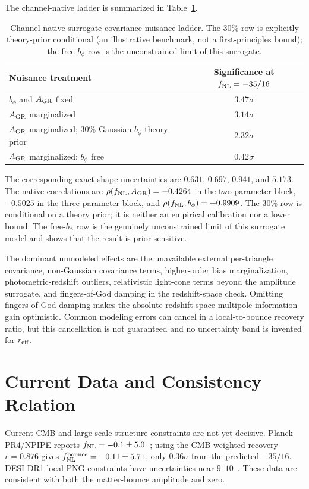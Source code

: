 \documentclass[aps,prd,twocolumn,superscriptaddress,showpacs,preprintnumbers,nofootinbib,longbibliography,floatfix]{revtex4-2}
\newcommand{\fnl}{f_{\rm NL}}
\begin{document}
The channel-native ladder is summarized in Table~\ref{tab:nuisance-ladder}.
\begin{table}[t]
\centering
\caption{Channel-native surrogate-covariance nuisance ladder. The 30\% row is explicitly theory-prior conditional (an illustrative benchmark, not a first-principles bound); the free-$b_\phi$ row is the unconstrained limit of this surrogate.}
\label{tab:nuisance-ladder}
\begin{tabular}{lc}
\toprule
Nuisance treatment & Significance at $\fnl=-35/16$ \\
\midrule
$b_\phi$ and $A_{\rm GR}$ fixed & $3.47\sigma$ \\
$A_{\rm GR}$ marginalized & $3.14\sigma$ \\
$A_{\rm GR}$ marginalized; 30\% Gaussian $b_\phi$ theory prior & $2.32\sigma$ \\
$A_{\rm GR}$ marginalized; $b_\phi$ free & $0.42\sigma$ \\
\bottomrule
\end{tabular}
\end{table}
The corresponding exact-shape uncertainties are $0.631$, $0.697$, $0.941$, and $5.173$. The native correlations are $\rho(\fnl,A_{\rm GR})=-0.4264$ in the two-parameter block, $-0.5025$ in the three-parameter block, and $\rho(\fnl,b_\phi)=+0.9909$. The 30\% row is conditional on a theory prior; it is neither an empirical calibration nor a lower bound. The free-$b_\phi$ row is the genuinely unconstrained limit of this surrogate model and shows that the result is prior sensitive.

The dominant unmodeled effects are the unavailable external per-triangle covariance, non-Gaussian covariance terms, higher-order bias marginalization, photometric-redshift outliers, relativistic light-cone terms beyond the amplitude surrogate, and fingers-of-God damping in the redshift-space check. Omitting fingers-of-God damping makes the absolute redshift-space multipole information gain optimistic. Common modeling errors can cancel in a local-to-bounce recovery ratio, but this cancellation is not guaranteed and no uncertainty band is invented for $r_{\rm eff}$.

\section{Current Data and Consistency Relation}
\label{sec:currentdata}

Current CMB and large-scale-structure constraints are not yet decisive. Planck PR4/NPIPE reports $\fnl=-0.1\pm5.0$~\cite{Jung2025PlanckPR4fNL}; using the CMB-weighted recovery $r=0.876$ gives $\fnl^{\rm bounce}=-0.11\pm5.71$, only $0.36\sigma$ from the predicted $-35/16$. DESI DR1 local-PNG constraints have uncertainties near $9$--$10$~\cite{Chaussidon2024DESIDR1fNL,Fondi2025DESIQSOassembly}. These data are consistent with both the matter-bounce amplitude and zero.
\end{document}
